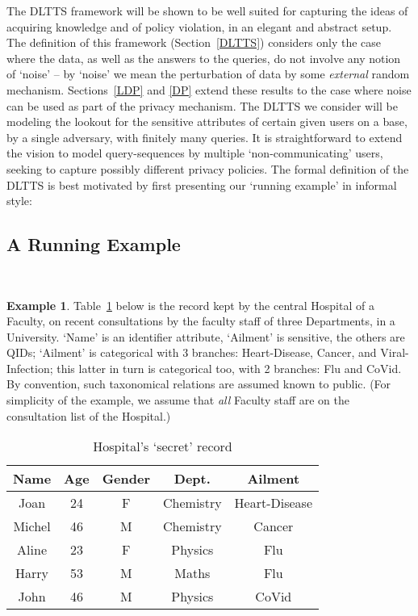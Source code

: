 \documentclass[pdflatex]{article}
\def \lft {\noindent}
\begin{document}
The DLTTS framework will be shown to be well suited for capturing the ideas of acquiring
knowledge and of policy violation, in an elegant and abstract setup.  The definition of this
framework (Section~\ref{DLTTS}) considers only the case where the data, as well as the
answers to the queries, do not involve any notion of `noise'   -- by `noise'  we mean the
perturbation of data by some {\em external}  random mechanism. Sections~\ref{LDP}
and \ref{DP} extend these results to the case where noise can be used as part of the
privacy mechanism.  The DLTTS we consider will be modeling the lookout for the
sensitive attributes of   certain given  users on a base, by a single adversary, with
finitely many queries.
  It is straightforward to extend  the  vision to model query-sequences by
  multiple `non-communicating' users, seeking   to capture possibly different
  privacy policies.  The formal definition of the DLTTS is best motivated by first
  presenting our `running example' in informal style: 
  

\vspace*{-1em} 
\subsection{A Running Example}~\label{RunningExample}

\vspace*{-1.5em} \lft
   {\bf Example 1}. Table~\ref{1} below is the record kept by the central Hospital
   of a  Faculty, on recent consultations by the faculty  staff of three Departments,
   in a University.  `Name' is an identifier  attribute, `Ailment' is  sensitive, the others
   are  QIDs; `Ailment' is categorical with 3 branches: Heart-Disease, Cancer,  and
 Viral-Infection; this latter in turn is categorical too, with 2 branches: Flu and CoVid.
 By convention, such taxonomical relations  are assumed known to public. 
 (For simplicity of the example, we assume that {\em all}  Faculty staff  are on the
 consultation list of the Hospital.) 

 \begin{table}[h]
   \centering
    \begin{tabular}{|c | c| c| c| c|}
  \hline
  Name  & Age  & Gender & Dept.  & Ailment  \\
  \hline
    Joan    &  24  & F  &  Chemistry  & Heart-Disease  \\
    Michel &  46  & M  &  Chemistry & Cancer  \\
     Aline  &  23  & F  &   Physics     &  Flu  \\
    Harry  &  53  &  M  &  Maths      &  Flu    \\
    John  &  46  &  M  &   Physics    &  CoVid   \\
    \hline
   \end{tabular}
    \caption{\label{1} Hospital's `secret' record }
  \vspace*{-1em}
 \end{table}
\end{document}
